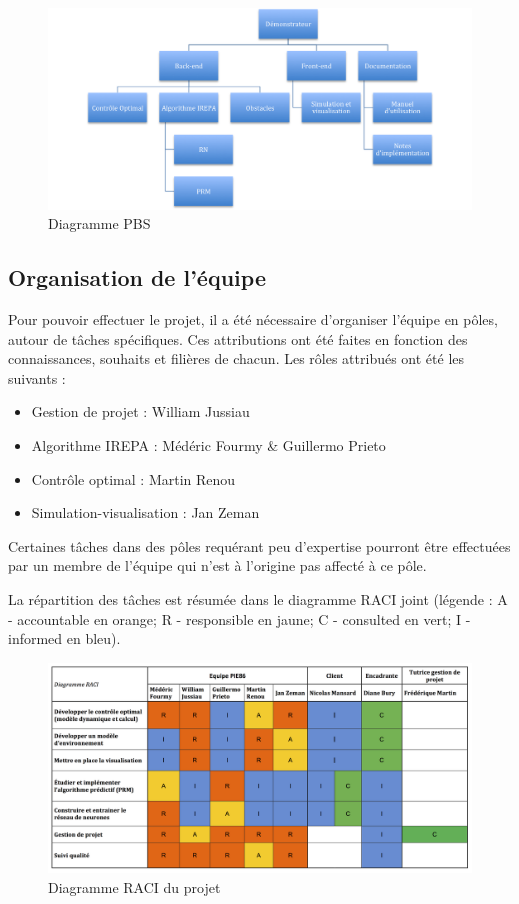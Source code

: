 \documentclass[a4paper,12pt]{report}
\newcommand{\bi}{\begin{itemize}}
\newcommand{\ei}{\end{itemize}}
\begin{document}
\begin{figure}[!htb]
\centering
\includegraphics[width=14cm]{pbs.png}
\caption{Diagramme PBS}
\end{figure}


\subsection{Organisation de l'équipe}
Pour pouvoir effectuer le projet, il a été nécessaire d'organiser l'équipe en pôles, autour de tâches spécifiques. Ces attributions ont été faites en fonction des connaissances, souhaits et filières de chacun. Les rôles attribués ont été les suivants : 
\bi
\item Gestion de projet : William Jussiau
\item Algorithme IREPA : Médéric Fourmy \& Guillermo Prieto
\item Contrôle optimal : Martin Renou
\item Simulation-visualisation : Jan Zeman
\ei

Certaines tâches dans des pôles requérant peu d'expertise pourront être effectuées par un membre de l'équipe qui n'est à l'origine pas affecté à ce pôle. 

La répartition des tâches est résumée dans le diagramme RACI joint (légende : A - accountable en orange; R - responsible en jaune; C - consulted en vert; I - informed en bleu).

\begin{figure}[!htb]
\centering
\includegraphics[width=16cm]{RACI.png}
\caption{Diagramme RACI du projet}
\end{figure}
\end{document}
